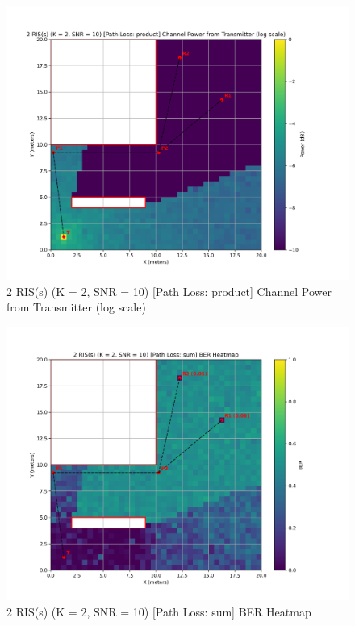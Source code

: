 \begin{figure}[H]
  \centering
  \includegraphics[width=0.8\linewidth]{imgs/heatmap-simulations/2 RIS(s) (K = 2, SNR = 10) [Path Loss_ product] Channel Power from Transmitter (log scale).png}
  \caption{2 RIS(s) (K = 2, SNR = 10) [Path Loss: product] Channel Power from Transmitter (log scale)}
\end{figure}


\begin{figure}[H]
  \centering
  \includegraphics[width=0.8\linewidth]{imgs/heatmap-simulations/2 RIS(s) (K = 2, SNR = 10) [Path Loss_ sum] BER Heatmap.png}
  \caption{2 RIS(s) (K = 2, SNR = 10) [Path Loss: sum] BER Heatmap}
\end{figure}

